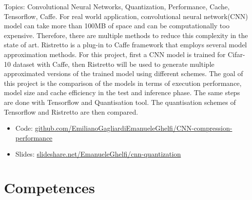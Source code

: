 \documentclass[11pt,a4paper,sans]{moderncv} %
\begin{document}
{
Topics: Convolutional Neural Networks, Quantization, Performance, Cache, Tensorflow, Caffe. 
\newline{}
For real world application, convolutional neural network(CNN) model can take more than 100MB of space and can be computationally too expensive. Therefore, there are multiple methods to reduce this complexity in the state of art. Ristretto is a plug-in to Caffe framework that employs several model approximation methods. For this project, first a CNN model is trained for Cifar-10 dataset with Caffe, then Ristretto will be used to generate multiple approximated versions of the trained model using different schemes. The goal of this project is the comparison of the models in terms of execution performance, model size and cache efficiency in the test and inference phase. The same steps are done with Tensorflow and Quantisation tool. The quantisation schemes of Tensorflow and Ristretto are then compared.
\newline{}
\begin{itemize}
	\item Code: \href{https://github.com/EmilianoGagliardiEmanueleGhelfi/CNN-compression-performance}{github.com/EmilianoGagliardiEmanueleGhelfi/CNN-compression-performance}
	\item Slides: \href{https://www.slideshare.net/EmanueleGhelfi/cnn-quantization}{slideshare.net/EmanueleGhelfi/cnn-quantization}
\end{itemize}
}



\section{Competences}
\end{document}
